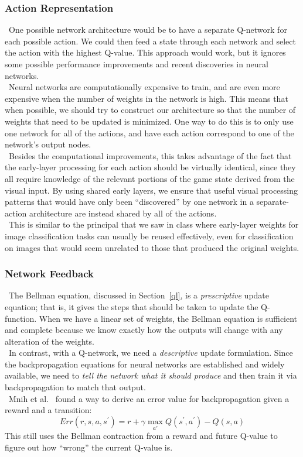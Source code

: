 \documentclass[conference]{IEEEtran}
\begin{document}
\subsubsection{Action Representation}
\noindent\ One possible network architecture would be to have a separate
Q-network for each possible action. We could then feed a state through each
network and select the action with the highest Q-value. This approach would
work, but it ignores some possible performance improvements and recent
discoveries in neural networks.\\
\indent\ Neural networks are computationally expensive to train, and are even
more expensive when the number of weights in the network is high. This means
that when possible, we should try to construct our architecture so that the
number of weights that need to be updated is minimized. One way to do this is
to only use one network for all of the actions, and have each action correspond
to one of the network's output nodes.\\
\indent\ Besides the computational improvements, this takes advantage of the
fact that the early-layer processing for each action should be virtually
identical, since they all require knowledge of the relevant portions of the
game state derived from the visual input.  By using shared early layers, we
ensure that useful visual processing patterns that would have only been
``discovered'' by one network in a separate-action architecture are instead
shared by all of the actions.\\
\indent\ This is similar to the principal that we saw in class where
early-layer weights for image classification tasks can usually be reused
effectively, even for classification on images that would seem unrelated to
those that produced the original weights.

\subsubsection{Network Feedback}
\noindent\ The Bellman equation, discussed in Section~\ref{ql}, is a
\emph{prescriptive} update equation; that is, it gives the steps that should be
taken to update the Q-function. When we have a linear set of weights, the
Bellman equation is sufficient and complete because we know exactly how the
outputs will change with any alteration of the weights.\\
\indent\ In contrast, with a Q-network, we need a \emph{descriptive} update
formulation.  Since the backpropagation equations for neural networks are
established and widely available, we need to \emph{tell the network what it
should produce} and then train it via backpropagation to match that output.\\
\indent\ Mnih et al.~\cite{mnih2013playing} found a way to derive an error
value for backpropagation given a reward and a transition:
\begin{equation}
    Err(r, s, a, s^{'})=r+\gamma\max_{a'}Q(s^{'},a^{'})-Q(s,a)
\end{equation}
This still uses the Bellman contraction from a reward and future Q-value to
figure out how ``wrong'' the current Q-value is.
\end{document}
